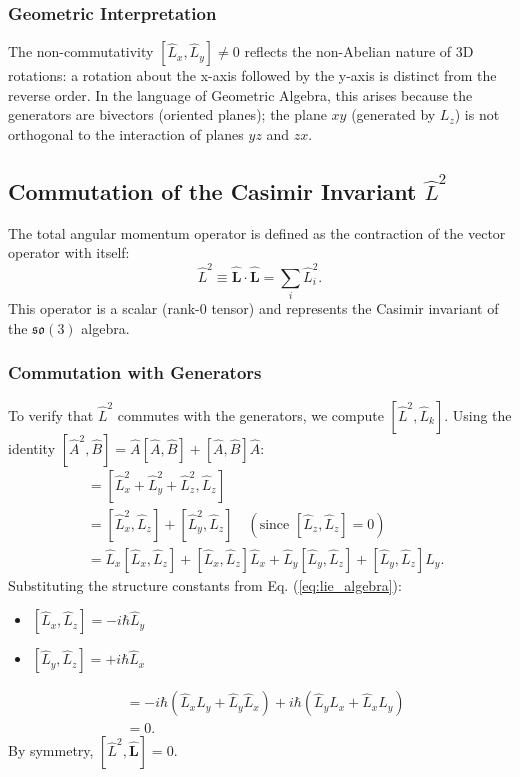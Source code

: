 \subsubsection{Geometric Interpretation}

The non-commutativity $[\hat{L}_x, \hat{L}_y] \neq 0$ reflects the non-Abelian
nature of 3D rotations: a rotation about the x-axis followed by the y-axis is
distinct from the reverse order. In the language of Geometric Algebra, this
arises because the generators are bivectors (oriented planes); the plane
$xy$ (generated by $L_z$) is not orthogonal to the interaction of planes $yz$
and $zx$.

\subsection{Commutation of the Casimir Invariant \texorpdfstring{$\hat{L}^2$}{L²}}

The total angular momentum operator is defined as the contraction of the vector
operator with itself:
\begin{equation}
  \hat{L}^2 \equiv \hat{\mathbf{L}} \cdot \hat{\mathbf{L}} = \sum_{i}
  \hat{L}_i^2.
\end{equation}
This operator is a scalar (rank-0 tensor) and represents the Casimir invariant
of the $\mathfrak{so}(3)$ algebra.

\subsubsection{Commutation with Generators}
To verify that $\hat{L}^2$ commutes with the generators, we compute $[\hat{L}^2,
\hat{L}_k]$. Using the identity $[\hat{A}^2, \hat{B}] = \hat{A}[\hat{A}, \hat{B}]
+ [\hat{A}, \hat{B}]\hat{A}$:
\begin{align}
  [\hat{L}^2, \hat{L}_z] &= [\hat{L}_x^2 + \hat{L}_y^2 + \hat{L}_z^2,
  \hat{L}_z] \nonumber \\
                         &= [\hat{L}_x^2, \hat{L}_z] + [\hat{L}_y^2, \hat{L}_z] \quad (\text{since }
                         [\hat{L}_z, \hat{L}_z]=0) \nonumber \\
                         &= \hat{L}_x[\hat{L}_x, \hat{L}_z] + [\hat{L}_x, \hat{L}_z]\hat{L}_x +
                         \hat{L}_y[\hat{L}_y, \hat{L}_z] + [\hat{L}_y, \hat{L}_z]\hat{L}_y.
\end{align}
Substituting the structure constants from Eq. (\ref{eq:lie_algebra}):
\begin{itemize}
  \item $[\hat{L}_x, \hat{L}_z] = -i\hbar \hat{L}_y$
  \item $[\hat{L}_y, \hat{L}_z] = +i\hbar \hat{L}_x$
\end{itemize}
\begin{align}
  [\hat{L}^2, \hat{L}_z] &= -i\hbar(\hat{L}_x \hat{L}_y + \hat{L}_y \hat{L}_x)
  + i\hbar(\hat{L}_y \hat{L}_x + \hat{L}_x \hat{L}_y) \nonumber \\
                         &= 0.
\end{align}
By symmetry, $[\hat{L}^2, \hat{\mathbf{L}}] = 0$.

